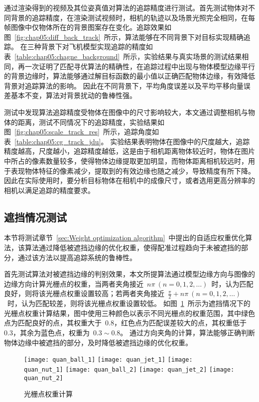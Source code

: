 通过渲染得到的视频及其位姿真值对算法的追踪精度进行测试。首先测试物体对不同背景的追踪精度，在渲染测试视频时，相机的轨迹以及场景光照完全相同，在每帧图像中仅物体所在的背景图案存在变化。追踪效果如图~\ref{fig:chap05:diff_back_track}~所示，算法能够在不同背景下对目标实现精确追踪。
在三种背景下对飞机模型实现追踪的精度如表~\ref{table:chap05:chagne_background}~所示，实验结果与真实场景的测试结果相同，再一次证明了匹配寻优算法的精确性，在追踪过程中出现与物体模型边缘平行的背景边缘时，算法能够通过解目标函数的最小值以正确匹配物体边缘，有效降低背景对追踪算法的影响。
因此在不同背景下，平均角度误差以及平均平移向量误差基本不变，算法对背景扰动的鲁棒性强。

测试中发现算法追踪精度受物体在图像中的尺寸影响较大，本文通过调整相机与物体的距离，测试不同情况下的追踪精度，实验结果如图~\ref{fig:chap05:scale_track_res}~所示，追踪角度如表~\ref{table:chap05:cg_track_jdu}。
实验结果表明物体在图像中的尺度越大，追踪精度越高，尺度越小，追踪精度越低，这是由于相机距离物体较近时，物体在图片中所占的像素数量较多，使得物体边缘提取更加明显，而物体距离相机较远时，用于表现物体特征的像素减少，提取到的有效边缘也随之减少，导致精度有所下降。
因此在实际使用时，要分析目标物体在相机中的成像尺寸，或者选用更高分辨率的相机以满足追踪的精度要求。



\subsection{遮挡情况测试}
\label{sec:obst_test}
本节将测试章节~\ref{sec:Weight optimization algorithm}~中提出的自适应权重优化算法，该算法通过降低被遮挡边缘的优化权重，使得配准过程趋向于未被遮挡的部分，通过该方法以提高追踪系统的鲁棒性。

首先测试算法对被遮挡边缘的判别效果，本文所提算法通过模型边缘方向与图像的边缘方向计算光栅点的权重，当两者夹角接近~$n\pi~(n=0,1,2,\dotsc)$~时，认为匹配良好，则将该光栅点权重设置较高；若两者夹角接近~$\frac{\pi}{2}+n\pi~(n=0,1,2,\dotsc)$~时，认为匹配较差，则将该光栅点权重设置较低。
如图~\ref{fig:chap05:point_weight_cal}~所示为遮挡情况下的光栅点权重计算结果，图中使用三种颜色以表示不同光栅点的权重范围，其中绿色点为匹配良好的点，其权重大于~$0.8$，红色点为匹配误差较大的点，其权重低于~$0.3$，其余为蓝色点，权重为~$0.3\sim 0.8$。
通过方向夹角的计算，算法能够正确判断物体边缘中被遮挡的部分，及时降低被遮挡边缘的优化权重。

\begin{figure}[t] %
    \centering%
      \texttt{[image: quan\_ball\_1]}
      \texttt{[image: quan\_jet\_1]}
      \texttt{[image: quan\_nut\_1]}
      \vskip 1pt
      \texttt{[image: quan\_ball\_2]}
      \texttt{[image: quan\_jet\_2]}
      \texttt{[image: quan\_nut\_2]}
    \caption{光栅点权重计算}
    \label{fig:chap05:point_weight_cal}
    \end{figure}

